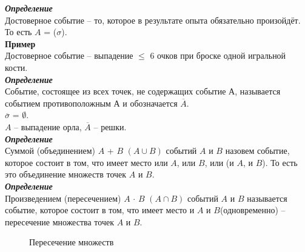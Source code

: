 \documentclass[russian, 12pt, fleqn,x11names]{article}
\begin{document}
\textit{\textbf{Определение}} \\Достоверное событие -- то, которое в результате опыта  обязательно произойдёт. То есть $A$ = ($\sigma$).\\
\textbf{Пример}\\Достоверное событие -- выпадение $\leq$ 6 очков при броске одной игральной кости.\\
\textit{\textbf{Определение}}\\ Событие, состоящее из всех точек, не содержащих событие А, называется событием противоположным А и обозначается $\overline{A}$.\\
$\overline{\sigma}$ = $\emptyset$.\\
$A$ -- выпадение орла, $\overline{A}$ -- решки.\\
\textit{\textbf{Определение}}\\ Суммой (объединением)  $A$ + $B$ $(A \cup B)$ событий $A$ и $B$ назовем событие, которое состоит в том, что имеет место или $A$, или $B$, или (и $A$, и $B$). То есть это объединение множеств точек $A$ и $B$.\\
\textit{\textbf{Определение}}\\Произведением (пересечением) $A$ $\cdot$ $B$ $(A \cap B)$ событий $A$ и $B$ называется событие, которое состоит в том, что имеет место и $A$ и $B$(одновременно) -- пересечение множества точек $A$ и $B$.\\
\begin{figure}[H]
\caption{Пересечение множеств}
\end{figure}
\end{document}
